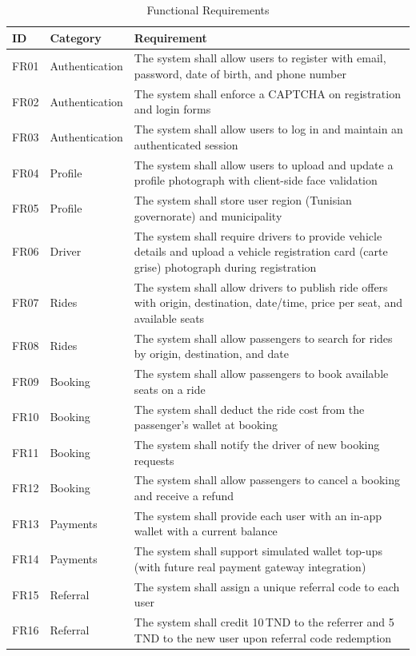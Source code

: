 \documentclass[12pt,a4paper,openright]{report}
\begin{document}
\begin{table}[H]
\centering
\caption{Functional Requirements}
\label{tab:func-req}
\begin{tabularx}{\textwidth}{l l X}
\toprule
\textbf{ID} & \textbf{Category} & \textbf{Requirement} \\
\midrule
FR01 & Authentication & The system shall allow users to register with email, password, date of birth, and phone number \\
FR02 & Authentication & The system shall enforce a CAPTCHA on registration and login forms \\
FR03 & Authentication & The system shall allow users to log in and maintain an authenticated session \\
FR04 & Profile & The system shall allow users to upload and update a profile photograph with client-side face validation \\
FR05 & Profile & The system shall store user region (Tunisian governorate) and municipality \\
FR06 & Driver & The system shall require drivers to provide vehicle details and upload a vehicle registration card (carte grise) photograph during registration \\
FR07 & Rides & The system shall allow drivers to publish ride offers with origin, destination, date/time, price per seat, and available seats \\
FR08 & Rides & The system shall allow passengers to search for rides by origin, destination, and date \\
FR09 & Booking & The system shall allow passengers to book available seats on a ride \\
FR10 & Booking & The system shall deduct the ride cost from the passenger's wallet at booking \\
FR11 & Booking & The system shall notify the driver of new booking requests \\
FR12 & Booking & The system shall allow passengers to cancel a booking and receive a refund \\
FR13 & Payments & The system shall provide each user with an in-app wallet with a current balance \\
FR14 & Payments & The system shall support simulated wallet top-ups (with future real payment gateway integration) \\
FR15 & Referral & The system shall assign a unique referral code to each user \\
FR16 & Referral & The system shall credit 10\,TND to the referrer and 5\,TND to the new user upon referral code redemption \\

\end{tabularx}
\end{table}
\end{document}
